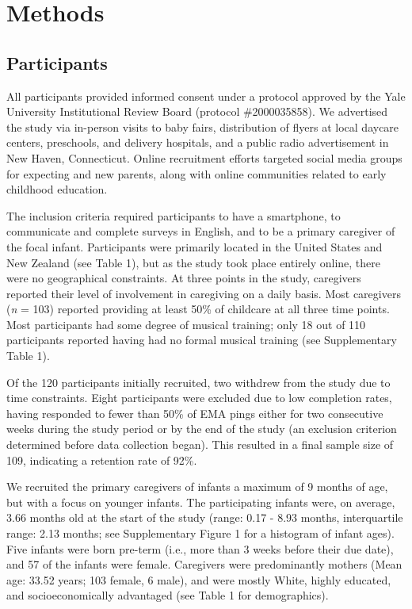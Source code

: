 \documentclass[
]{article}
\begin{document}
\section{Methods}\label{methods}

\subsection{Participants}\label{participants}

All participants provided informed consent under a protocol approved by
the Yale University Institutional Review Board (protocol \#2000035858).
We advertised the study via in-person visits to baby fairs, distribution
of flyers at local daycare centers, preschools, and delivery hospitals,
and a public radio advertisement in New Haven, Connecticut. Online
recruitment efforts targeted social media groups for expecting and new
parents, along with online communities related to early childhood
education.

The inclusion criteria required participants to have a smartphone, to
communicate and complete surveys in English, and to be a primary
caregiver of the focal infant. Participants were primarily located in
the United States and New Zealand (see Table 1), but as the study took
place entirely online, there were no geographical constraints. At three
points in the study, caregivers reported their level of involvement in
caregiving on a daily basis. Most caregivers (\emph{n} = 103) reported
providing at least 50\% of childcare at all three time points. Most
participants had some degree of musical training; only 18 out of 110
participants reported having had no formal musical training (see
Supplementary Table 1).

Of the 120 participants initially recruited, two withdrew from the study
due to time constraints. Eight participants were excluded due to low
completion rates, having responded to fewer than 50\% of EMA pings
either for two consecutive weeks during the study period or by the end
of the study (an exclusion criterion determined before data collection
began). This resulted in a final sample size of 109, indicating a
retention rate of 92\%.

We recruited the primary caregivers of infants a maximum of 9 months of
age, but with a focus on younger infants. The participating infants
were, on average, 3.66 months old at the start of the study (range: 0.17
- 8.93 months, interquartile range: 2.13 months; see Supplementary
Figure 1 for a histogram of infant ages). Five infants were born
pre-term (i.e., more than 3 weeks before their due date), and 57 of the
infants were female. Caregivers were predominantly mothers (Mean age:
33.52 years; 103 female, 6 male), and were mostly White, highly
educated, and socioeconomically advantaged (see Table 1 for
demographics).
\end{document}
